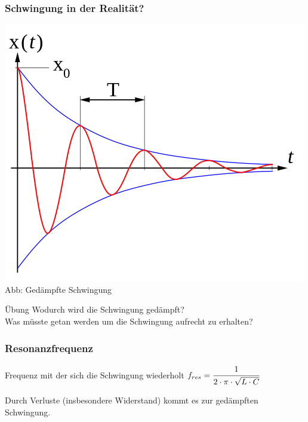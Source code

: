 \begin{frame}
\frametitle{Schwingung in der Realität?}
    \begin{center}
	    \includegraphics[width=.8\textwidth,height=.8\textheight,keepaspectratio]{e07/Damped_oscillation_graph.png}\\
	    Abb: Gedämpfte Schwingung \\
    \end{center}
    \begin{block}{\"Ubung}
        Wodurch wird die Schwingung gedämpft? \\ Was müsste getan werden um die Schwingung aufrecht zu erhalten?
    \end{block}
\end{frame}

\begin{frame}
\frametitle{Resonanzfrequenz}
\begin{center}
  \begin{block}{Frequenz mit der sich die Schwingung wiederholt}
	\Huge{$ f_{res} = \cfrac{1}{2 \cdot \pi \cdot \sqrt{L \cdot C}} $}
  \end{block}
  \pause
  Durch Verluste (insbesondere Widerstand) kommt es zur gedämpften Schwingung.
\end{center}
\end{frame}

